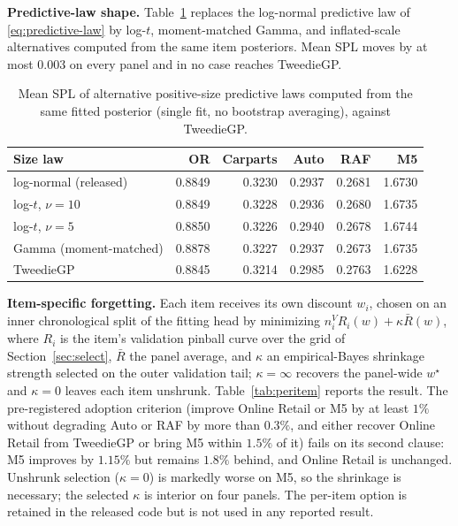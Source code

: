 \textbf{Predictive-law shape.} Table~\ref{tab:shape} replaces the
log-normal predictive law of \eqref{eq:predictive-law} by log-$t$,
moment-matched Gamma, and inflated-scale alternatives computed from the
same item posteriors. Mean SPL moves by at most $0.003$ on every panel and
in no case reaches TweedieGP.

\begin{table}[t]
\centering
\caption{Mean SPL of alternative positive-size predictive laws computed
from the same fitted \EBB{} posterior (single fit, no bootstrap averaging),
against TweedieGP.}
\label{tab:shape}
\small
\setlength{\tabcolsep}{3.5pt}
\begin{tabular}{lrrrrr}
\toprule
Size law & OR & Carparts & Auto & RAF & M5\\
\midrule
log-normal (released) & 0.8849 & 0.3230 & 0.2937 & 0.2681 & 1.6730\\
log-$t$, $\nu{=}10$ & 0.8849 & 0.3228 & 0.2936 & 0.2680 & 1.6735\\
log-$t$, $\nu{=}5$ & 0.8850 & 0.3226 & 0.2940 & 0.2678 & 1.6744\\
Gamma (moment-matched) & 0.8878 & 0.3227 & 0.2937 & 0.2673 & 1.6735\\
\midrule
TweedieGP & 0.8845 & 0.3214 & 0.2985 & 0.2763 & 1.6228\\
\bottomrule
\end{tabular}
\end{table}

\textbf{Item-specific forgetting.} Each item receives its own discount
$w_i$, chosen on an inner chronological split of the fitting head by
minimizing $n_i^{V}R_i(w)+\kappa\bar R(w)$, where $R_i$ is the item's
validation pinball curve over the grid of Section~\ref{sec:select},
$\bar R$ the panel average, and $\kappa$ an empirical-Bayes shrinkage
strength selected on the outer validation tail;
$\kappa{=}\infty$ recovers the panel-wide $w^{\star}$ and $\kappa{=}0$
leaves each item unshrunk. Table~\ref{tab:peritem} reports the result.
The pre-registered adoption criterion (improve Online Retail or M5 by at
least $1\%$ without degrading Auto or RAF by more than $0.3\%$, and
either recover Online Retail from TweedieGP or bring M5 within $1.5\%$ of
it) fails on its second clause: M5 improves by $1.15\%$ but remains
$1.8\%$ behind, and Online Retail is unchanged. Unshrunk selection
($\kappa{=}0$) is markedly worse on M5, so the shrinkage is necessary; the
selected $\kappa$ is interior on four panels. The per-item option is
retained in the released code but is not used in any reported result.

